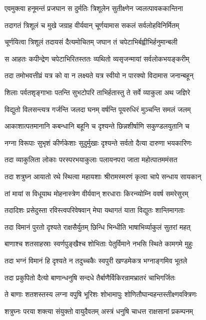 \twolineshloka
{एवमुक्त्वा हनूमन्तं प्रजघान स दुर्मतिः}
{त्रिशूलेन सुतीक्ष्णेन ज्वलत्पावककान्तिना}%

\twolineshloka
{तदागतं त्रिशूलं च मुखे जग्राह वीर्यवान्}
{चूर्णयामास सकलं सर्वलोहविनिर्मितम्}%

\twolineshloka
{चूर्णयित्वा त्रिशूलं तदायसं दैत्यमोचितम्}
{जघान तं चपेटाभिर्बह्वीभिर्हनुमान्बली}%

\twolineshloka
{स आहतः कपीन्द्रेण चपेटाभिरितस्ततः}
{व्यथितो व्यसृजन्मायां सर्वलोकभयङ्करीम्}%

\twolineshloka
{तदा तमोभवत्तीव्रं यत्र को वा न लक्ष्यते}
{यत्र स्वीयो न पारक्यो विदामास जनान्बहून्}%

\twolineshloka
{शिलाः पर्वतशृङ्गाभाः पतन्ति सुभटोपरि}
{ताभिर्हतास्तु ते सर्वे व्याकुला अथ जज्ञिरे}%

\twolineshloka
{विद्युतो विलसन्त्यत्र गर्जन्ति जलदा घनम्}
{वर्षन्ति पूयरुधिरं मुञ्चन्ति समलं जलम्}%

\twolineshloka
{आकाशात्पतमानानि कबन्धानि बहूनि च}
{दृश्यन्ते छिन्नशीर्षाणि सकुण्डलयुतानि च}%

\twolineshloka
{नग्ना विरूपाः सुभृशं कीर्णकेशाः सुदुर्मुखाः}
{दृश्यन्ते सर्वतो दैत्या दारुणा भयकारिणः}%

\twolineshloka
{तदा व्याकुलिता लोकाः परस्परभयाकुलाः}
{पलायनपरा जाता महोत्पातममंसत}%

\twolineshloka
{तदा शत्रुघ्न आयातो रथे स्थित्वा महायशाः}
{श्रीरामस्मरणं कृत्वा चापे सन्धाय सायकान्}%

\twolineshloka
{तां मायां स विधूयाथ मोहनास्त्रेण वीर्यवान्}
{शरधाराः किरन्व्योम्नि ववर्ष समरेसुरम्}%

\twolineshloka
{तदादिशः प्रसेदुस्ता रविस्त्वपरिवेषवान्}
{मेघा यथागतं याता विद्युतः शान्तिमागताः}%

\twolineshloka
{तदा विमानं पुरतो दृश्यते राक्षसैर्युतम्}
{छिन्धि भिन्धीति भाषाभिर्व्याकुलं सुतरां महत्}%

\twolineshloka
{बाणाश्च शतसाहस्राः स्वर्णपुङ्खैश्च शोभिताः}
{पेतुर्विमाने नभसि स्थिते कामगमे मुहुः}%

\twolineshloka
{तदा भग्नं विमानं हि दृश्यते न तदुच्चकैः}
{स्वपुरी खण्डमेकत्र भग्नाङ्गमिव भूतले}%

\twolineshloka
{तदा प्रकुपितो दैत्यो बाणान्धनुषि सन्दधे}
{तैर्बाणैर्विकिरन्रामभ्रातरं चाभिगर्जितः}%

\twolineshloka
{ते बाणाः शतशस्तस्य लग्ना वपुषि भूरिशः}
{शोभामापुः शोणितौघान्वहन्तस्तीक्ष्णवक्त्रिणः}%

\twolineshloka
{शत्रुघ्नः परया शक्त्या संयुक्तो वायुदैवतम्}
{अस्त्रं धनुषि चाधत्त राक्षसानां प्रकम्पनम्}%

